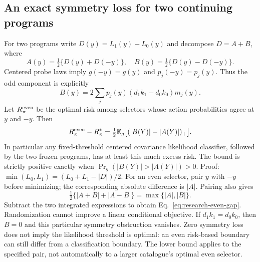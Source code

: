 \subsection{An exact symmetry loss for two continuing programs}
For two programs write $D(y)=L_1(y)-L_0(y)$ and decompose $D=A+B$, where
\[
A(y)=\tfrac12\{D(y)+D(-y)\},\quad
B(y)=\tfrac12\{D(y)-D(-y)\}.
\]
Centered probe laws imply $g(-y)=g(y)$ and $p_j(-y)=p_j(y)$.
Thus the odd component is explicitly
\[
B(y)=2\sum_jp_j(y)(d_1k_1-d_0k_0)m_j(y).
\]
Let $R_\pi^{\rm even}$ be the optimal risk among selectors whose action probabilities agree at $y$ and $-y$.
Then
\begin{equation}
R_\pi^{\rm even}-R_\pi^*
=\tfrac12\mathbb E_g\big[(|B(Y)|-|A(Y)|)_+\big].
\label{eq:research-even-gap}
\end{equation}
In particular any fixed-threshold centered covariance likelihood classifier, followed by the two frozen programs, has at least this much excess risk.
The bound is strictly positive exactly when $\Pr_g(|B(Y)|>|A(Y)|)>0$.
Proof: $\min(L_0,L_1)=(L_0+L_1-|D|)/2$.
For an even selector, pair $y$ with $-y$ before minimizing; the corresponding absolute difference is $|A|$.
Pairing also gives
\[
\tfrac12\{|A+B|+|A-B|\}=\max\{|A|,|B|\}.
\]
Subtract the two integrated expressions to obtain Eq.~\eqref{eq:research-even-gap}.
Randomization cannot improve a linear conditional objective.
If $d_1k_1=d_0k_0$, then $B=0$ and this particular symmetry obstruction vanishes.
Zero symmetry loss does not imply the likelihood threshold is optimal: an even risk-based boundary can still differ from a classification boundary.
The lower bound applies to the specified pair, not automatically to a larger catalogue's optimal even selector.

